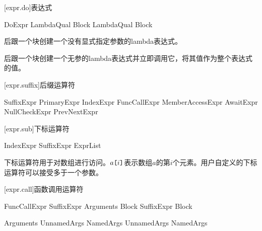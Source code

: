 [expr.do]{表达式}

\begin{bnf}{DoExpr}
    LambdaQual\bnfs {} Block \br
    LambdaQual\bnfs {} \terminal{!} Block
\end{bnf}

\pnum
{}后跟一个块创建一个没有显式指定参数的lambda表达式。

\pnum
{}后跟一个块创建一个无参的lambda表达式并立即调用它，将其值作为整个表达式的值。

\enterexample
{}
\exitexample

[expr.suffix]{后缀运算符}

\begin{bnf}{SuffixExpr}
    PrimaryExpr \br
    IndexExpr \br
    FuncCallExpr \br
    MemberAccessExpr \br
    AwaitExpr \br
    NullCheckExpr \br
    PrevNextExpr
\end{bnf}

[expr.sub]{下标运算符}

\begin{bnf}{IndexExpr}
    SuffixExpr \terminal{[} ExprList\bnfq \terminal{]}
\end{bnf}

\pnum
下标运算符用于对数组进行访问。$a\texttt{[}i\texttt{]}$表示数组$a$的第$i$个元素。用户自定义的下标运算符可以接受多于一个参数。

[expr.call]{函数调用运算符}

\begin{bnf}{FuncCallExpr}
    SuffixExpr \terminal{(} Arguments\bnfq \terminal{)} Block\bnfs \br
    SuffixExpr Block
\end{bnf}

\begin{bnf}{Arguments}
    UnnamedArgs \br
    NamedArgs \br
    UnnamedArgs \terminal{,} NamedArgs
\end{bnf}

